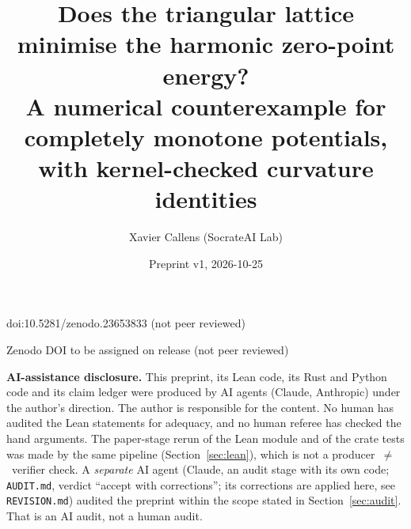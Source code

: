 \documentclass[10pt]{article}
\title{Does the triangular lattice minimise the harmonic zero-point energy?\\
A numerical counterexample for completely monotone potentials,\\
with kernel-checked curvature identities}
\author{Xavier Callens (SocrateAI Lab)}
\date{Preprint v1, 2026-10-25}
\begin{document}
\maketitle
\begin{center}\small doi:10.5281/zenodo.23653833 \quad (not peer reviewed)\end{center}

\begin{center}\small Zenodo DOI to be assigned on release \quad (not peer reviewed)\end{center}

\noindent\textbf{AI-assistance disclosure.} This preprint, its Lean code, its Rust and Python code and its claim ledger were
produced by AI agents (Claude, Anthropic) under the author's direction. The author is responsible for the content. No human
has audited the Lean statements for adequacy, and no human referee has checked the hand arguments. The paper-stage rerun of the Lean
module and of the crate tests was made by the same pipeline (Section~\ref{sec:lean}), which is not a producer~$\neq$~verifier check.
A \emph{separate} AI agent (Claude, an audit stage with its own code; \texttt{AUDIT.md}, verdict ``accept with corrections''; its corrections are applied here, see \texttt{REVISION.md})
audited the preprint within the scope stated in Section~\ref{sec:audit}. That is an AI audit, not a human audit.
\end{document}
